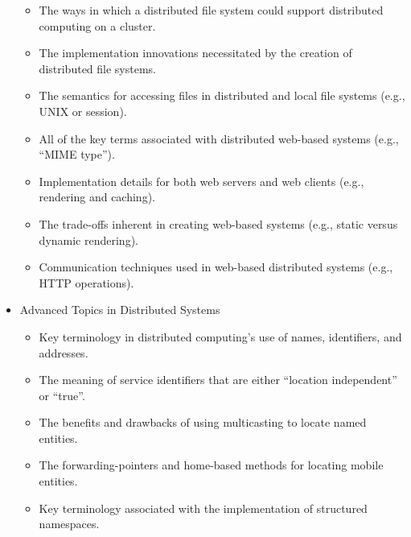 \begin{itemize}[leftmargin=0.25in]
\begin{itemize}[leftmargin=0in]
      \item The ways in which a distributed file system could support distributed computing on a cluster.

      \item The implementation innovations necessitated by the creation of distributed file systems.

      \item The semantics for accessing files in distributed and local file systems (e.g., UNIX or session).

      \item All of the key terms associated with distributed web-based systems (e.g., ``MIME type'').

      \item Implementation details for both web servers and web clients (e.g., rendering and caching).

      \item The trade-offs inherent in creating web-based systems (e.g., static versus dynamic rendering).

      \item Communication techniques used in web-based distributed systems (e.g., HTTP operations).


    \end{itemize}

  \item Advanced Topics in Distributed Systems

    \vspace*{-.05in}
    \begin{itemize}[leftmargin=0in]

      \itemsep 0in

      \item Key terminology in distributed computing's use of names, identifiers, and addresses.

      \item The meaning of service identifiers that are either ``location independent'' or ``true''.

      \item The benefits and drawbacks of using multicasting to locate named entities.

      \item The forwarding-pointers and home-based methods for locating mobile entities.

      \item Key terminology associated with the implementation of structured namespaces.


\end{itemize}
\end{itemize}
